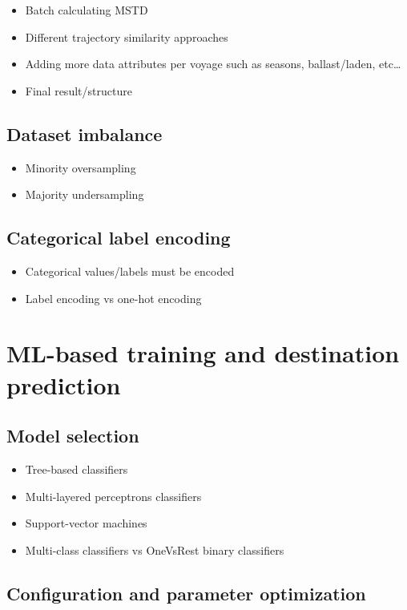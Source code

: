 \begin{itemize}
    \item Batch calculating MSTD
    \item Different trajectory similarity approaches
    \item Adding more data attributes per voyage such as seasons, ballast/laden, etc\ldots
    \item Final result/structure
\end{itemize}

\subsection{Dataset imbalance}

\begin{itemize}
    \item Minority oversampling
    \item Majority undersampling
\end{itemize}

\subsection{Categorical label encoding}

\begin{itemize}
    \item Categorical values/labels must be encoded
    \item Label encoding vs one-hot encoding
\end{itemize}

\section{ML-based training and destination prediction}

\subsection{Model selection}

\begin{itemize}
    \item Tree-based classifiers
    \item Multi-layered perceptrons classifiers
    \item Support-vector machines
    \item Multi-class classifiers vs OneVsRest binary classifiers
\end{itemize}

\subsection{Configuration and parameter optimization}


